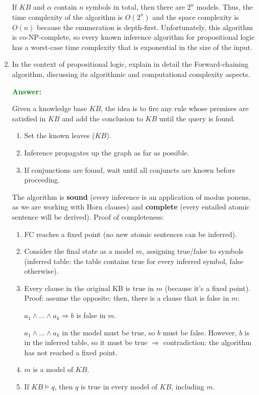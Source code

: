 \documentclass[12pt]{article}
\begin{document}
\begin{enumerate}[label=\textbf{PL.\arabic*}]
          If $KB$ and $\alpha$ contain $n$ symbols in total, then there are $2^n$ models. Thus, the time complexity of the algorithm is $O(2^n)$ and the space complexity is $O(n)$ because the enumeration is depth-first. Unfortunately, this algorithm is co-NP-complete, so every known inference algorithm for propositional logic has a worst-case time complexity that is exponential in the size of the input.


    \item In the context of propositional logic, explain in detail the Forward-chaining algorithm, discussing its algorithmic and computational complexity aspects.

          \textcolor{green}{\textbf{Answer:}}

          Given a knowledge base $KB$, the idea is to fire any rule whose premises are satisfied in $KB$ and add the conclusion to $KB$ until the query is found.

          \begin{enumerate}[label=\roman*.]
              \item Set the known leaves ($KB$).
              \item Inference propagates up the graph as far as possible.
              \item If conjunctions are found, wait until all conjuncts are known before proceeding.
          \end{enumerate}

          The algorithm is \textbf{sound} (every inference is an application of modus ponens, as we are working with Horn clauses) and \textbf{complete} (every entailed atomic sentence will be derived). Proof of completeness:

          \begin{enumerate}
              \item FC reaches a fixed point (no new atomic sentences can be inferred).
              \item Consider the final state as a model $m$, assigning true/false to symbols (inferred table: the table contains true for every inferred symbol, false otherwise).
              \item Every clause in the original KB is true in $m$ (because it's a fixed point). Proof: assume the opposite; then, there is a clause that is false in $m$:

                    $a_1\land\ldots\land a_k\Rightarrow b$ is false in $m$.

                    $a_1\land\ldots\land a_k$ in the model must be true, so $b$ must be false. However, $b$ is in the inferred table, so it must be true $\Rightarrow$ contradiction: the algorithm has not reached a fixed point.
              \item $m$ is a model of $KB$.
              \item If $KB\vDash q$, then $q$ is true in every model of $KB$, including $m$.
          \end{enumerate}


\end{enumerate}
\end{document}

